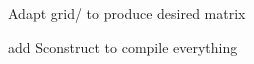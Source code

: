 
\begin{DoxyRefList}
\item[\label{todo__todo000001}%
\hypertarget{todo__todo000001}{}%
Type \hyperlink{classmirana}{mirana} ]Adapt grid/ to produce desired matrix 

add Sconstruct to compile everything 
\end{DoxyRefList}
